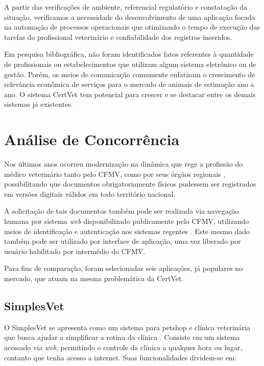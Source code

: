 \documentclass[
    12pt,               %
    openright,          %
    oneside,
    a4paper,            %
    BIBLATEX,           %
    TODO,               %
    english,            %
    brazil              %
    ]{ifsp-spo-inf-ctds}
\begin{document}
    A partir das verificações de ambiente, referencial regulatório e constatação da situação, verificamos a necessidade do desenvolvimento de uma aplicação focada na automação de processos operacionais que otimizando o tempo de execução das tarefas do profissional veterinário e confiabilidade dos registros inseridos.

    Em pesquisa bibliográfica, não foram identificados fatos referentes à quantidade de profissionais ou estabelecimentos que utilizam algum sistema eletrônico ou de gestão. Porém, os meios de comunicação comumente enfatizam o crescimento de relevância econômica de serviços para o mercado de animais de estimação ano a ano. O sistema CertVet tem potencial para crescer e se destacar entre os demais sistemas já existentes.

    \section{Análise de Concorrência} \label{analise_concorrência}

        Nos últimos anos ocorreu modernização na dinâmica que rege a profissão do médico veterinário tanto pelo CFMV, como por seus órgãos regionais  , possibilitando que documentos obrigatoriamente físicos pudessem ser registrados em versões digitais válidos em todo território nacional. 

        A solicitação de tais documentos também pode ser realizada via navegação humana por sistema \emph{web} disponibilizado publicamente pelo CFMV, utilizando meios de identificação e autenticação nos sistemas regentes . Este mesmo dado também pode ser utilizado por interface de aplicação, uma vez liberado por usuário habilitado por intermédio do CFMV.

        Para fins de comparação, foram selecionadas seis aplicações, já populares no mercado, que atuam na mesma problemática da CertVet.

    \subsection{SimplesVet}
    O SimplesVet se apresenta como um sistema para petshop e clínica veterinária que busca ajudar a simplificar a rotina da clínica . Consiste em um sistema acessado via \emph{web}, permitindo o controle da clínica a qualquer hora ou lugar, contanto que tenha acesso a internet. Suas funcionalidades dividem-se em:
\end{document}
